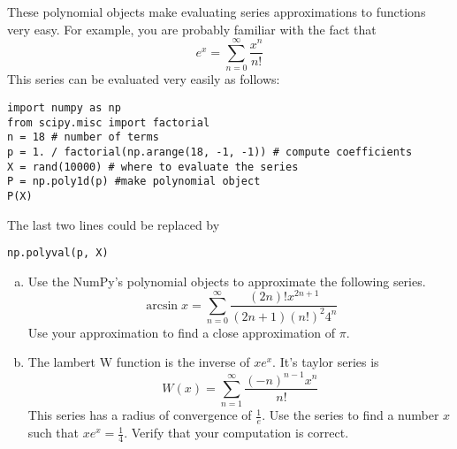 These polynomial objects make evaluating series approximations to functions very easy.
For example, you are probably familiar with the fact that
\[
e^x = \sum_{n=0}^{\infty} \frac{x^n}{n!}
\]
This series can be evaluated very easily as follows:
\begin{lstlisting}
import numpy as np
from scipy.misc import factorial
n = 18 # number of terms
p = 1. / factorial(np.arange(18, -1, -1)) # compute coefficients
X = rand(10000) # where to evaluate the series
P = np.poly1d(p) #make polynomial object
P(X)
\end{lstlisting}
The last two lines could be replaced by
\begin{lstlisting}
np.polyval(p, X)
\end{lstlisting}

\begin{problem}
\begin{enumerate}[a)]
\item Use the NumPy's polynomial objects to approximate the following series.
\[
\arcsin x = \sum_{n=0}^{\infty} \frac{\left(2 n\right) ! x^{2 n + 1}}{\left(2 n + 1\right)\left(n!\right)^2 4^n}
\]
Use your approximation to find a close approximation of $\pi$.

\item The lambert W function is the inverse of $x e^x$.
It's taylor series is
\[
W(x) = \sum_{n=1}^{\infty} \frac{\left(-n\right)^{n-1} x^n}{n!}
\]
This series has a radius of convergence of $\frac{1}{e}$.
Use the series to find a number $x$ such that $x e^x = \frac{1}{4}$.
Verify that your computation is correct.
\end{enumerate}
\end{problem}

